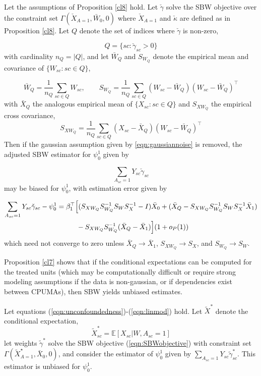 \begin{proposition}\label{cl9}
Let the assumptions of Proposition \ref{cl8} hold. Let $\check{\gamma}$ solve the SBW objective over the constraint set $\Gamma(\check{X}_{A=1}, \bar{W}_0, 0)$ where $\check{X}_{A=1}$ and $\check{\kappa}$ are defined as in Proposition \ref{cl8}. Let $Q$ denote the set of indices where $\check{\gamma}$ is non-zero,

\[ Q = \{sc: \check{\gamma}_{sc} > 0\}\]
with cardinality $n_Q = |Q|$, and let $\bar{W}_Q$ and $S_{W_Q}$ denote the empirical mean and covariance of $\{W_{sc}:sc \in Q\}$,

\[ \bar{W}_Q = \frac{1}{n_Q}\sum_{sc \in Q} W_{sc},\qquad S_{W_Q} = \frac{1}{n_Q} \sum_{sc \in Q} (W_{sc} - \bar{W}_Q)(W_{sc} - \bar{W}_Q)^\top\]
with $\bar{X}_Q$ the analogous empirical mean of $\{X_{sc}:sc \in Q\}$ and $S_{XW_Q}$ the empirical cross covariance,
\[ S_{XW_Q} = \frac{1}{n_Q} \sum_{sc \in Q} (X_{sc} - \bar{X}_Q)(W_{sc} - \bar{W}_Q)^\top\]
Then if the gaussian assumption given by \eqref{eqn:gaussiannoise} is removed, the adjusted SBW estimator for $\psi_0^1$ given by 

\[\sum_{A_{sc}=1} Y_{sc} \check{\gamma}_{sc}\]
may be biased for $\psi_0^1$, with estimation error given by 

\begin{align} 
\nonumber \sum_{A_{sc}=1} Y_{sc} \check{\gamma}_{sc} - \psi_0^1 & = \beta_1^\top \Big[(S_{XW_Q}S_{W_Q}^{-1}S_WS_X^{-1} - I)\bar{X}_0  + (\bar{X}_Q - S_{XW_Q}S_{W_Q}^{-1} S_W S_X^{-1} \bar{X}_1) \\
& \hskip1cm {} - S_{XW_Q}S_{W_Q}^{-1}(\bar{X}_Q - \bar{X}_1)\Big](1 + o_P(1))  \label{eqn:cl9.error}
\end{align}
which need not converge to zero unless $\bar{X}_Q \to \bar{X}_1$, $S_{XW_Q} \to S_X$, and $S_{W_Q} \to S_W$.
\end{proposition}

Proposition \ref{cl7} shows that if the conditional expectations can be computed for the treated units (which may be computationally difficult or require strong modeling assumptions if the data is non-gaussian, or if dependencies exist between CPUMAs), then SBW yields unbiased estimates. 

\begin{proposition}\label{cl7}
    Let equations (\ref{eqn:unconfoundedness})-(\ref{eqn:linmod}) hold. Let $\tilde{X}^*$ denote the conditional expectation,
    \[\tilde{X}^*_{sc} = \mathbb{E}[X_{sc} | W, A_{sc}=1]\]
    let weights $\tilde{\gamma}^*$ solve the SBW objective (\ref{eqn:SBWobjective}) with constraint set $\Gamma(\tilde{X}^\star_{A=1}, \bar{X}_0, 0)$, and consider the estimator of $\psi_0^1$ given by $\sum_{A_{sc}=1} Y_{sc} \tilde{\gamma}^*_{sc}$. This estimator is unbiased for $\psi_0^1$.
\end{proposition}

